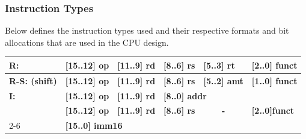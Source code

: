 \documentclass{article}
\begin{document}
\subsubsection{Instruction Types}

Below defines the instruction types used and their respective formats and bit allocations that are used in the CPU design.

\begin{table}[!h]
\centering
\begin{tabular}{|l|lllll}
\hline
\rowcolor[HTML]{FCE4D6} 
\textbf{R:}                                            & \multicolumn{1}{l|}{\cellcolor[HTML]{FCE4D6}\textbf{{[}15..12{]} op}} & \multicolumn{1}{l|}{\cellcolor[HTML]{FCE4D6}\textbf{{[}11..9{]} rd}}   & \multicolumn{1}{l|}{\cellcolor[HTML]{FCE4D6}\textbf{{[}8..6{]} rs}} & \multicolumn{1}{l|}{\cellcolor[HTML]{FCE4D6}\textbf{{[}5..3{]} rt}}  & \multicolumn{1}{l|}{\cellcolor[HTML]{FCE4D6}\textbf{{[}2..0{]} funct}} \\ \hline
\rowcolor[HTML]{FCE4D6} 
\textbf{R-S: (shift)}                                  & \multicolumn{1}{l|}{\cellcolor[HTML]{FCE4D6}\textbf{{[}15..12{]} op}} & \multicolumn{1}{l|}{\cellcolor[HTML]{FCE4D6}\textbf{{[}11..9{]} rd}}   & \multicolumn{1}{l|}{\cellcolor[HTML]{FCE4D6}\textbf{{[}8..6{]} rs}} & \multicolumn{1}{l|}{\cellcolor[HTML]{FCE4D6}\textbf{{[}5..2{]} amt}} & \multicolumn{1}{l|}{\cellcolor[HTML]{FCE4D6}\textbf{{[}1..0{]} funct}} \\ \hline
\rowcolor[HTML]{FFF2CC} 
\textbf{I:}                                            & \multicolumn{1}{l|}{\cellcolor[HTML]{FFF2CC}\textbf{{[}15..12{]} op}} & \multicolumn{1}{l|}{\cellcolor[HTML]{FFF2CC}\textbf{{[}11..9{]} rd}}   & \multicolumn{3}{l}{\cellcolor[HTML]{FFF2CC}\textbf{{[}8..0{]} addr}}                                                                                                                                                \\ \hline
\rowcolor[HTML]{E2EFDA} 
\cellcolor[HTML]{E2EFDA}                               & \multicolumn{1}{l|}{\cellcolor[HTML]{E2EFDA}\textbf{{[}15..12{]} op}} & \multicolumn{1}{l|}{\cellcolor[HTML]{E2EFDA}\textbf{{[}11..9{]} rd}}   & \multicolumn{1}{l|}{\cellcolor[HTML]{E2EFDA}\textbf{{[}8..6{]} rs}} & \multicolumn{1}{c|}{\cellcolor[HTML]{E2EFDA}\textbf{-}}              & \multicolumn{1}{l|}{\cellcolor[HTML]{E2EFDA}\textbf{{[}2..0{]}funct}}  \\ \cline{2-6} 
\rowcolor[HTML]{E2EFDA} 
\multirow{-2}{*}{\cellcolor[HTML]{E2EFDA}\textbf{R-I}} & \multicolumn{5}{l}{\cellcolor[HTML]{E2EFDA}\textbf{{[}15..0{]} imm16}}                                                                                                                                                                                                                                                                                               \\ \hline

\end{tabular}
\end{table}
\end{document}
